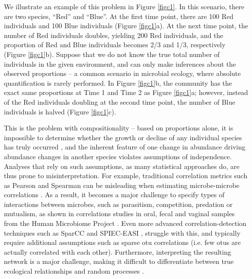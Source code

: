 We illustrate an example of this problem in Figure \ref{figc1}.  In this scenario, there are two species, “Red” and “Blue”. At the first time point, there are 100 Red individuals and 100 Blue individuals (Figure \ref{figc1}a). At the next time point, the number of Red individuals doubles, yielding 200 Red individuals, and the proportion of Red and Blue individuals becomes 2/3 and 1/3, respectively (Figure \ref{figc1}b). Suppose that we do not know the true total number of individuals in the given environment, and can only make inferences about the observed proportions -- a common scenario in microbial ecology, where absolute quantification is rarely performed.  In Figure \ref{figc1}b, the community has the exact same proportions at Time 1 and Time 2 as Figure \ref{figc1}a; however, instead of the Red individuals doubling at the second time point, the number of Blue individuals is halved (Figure \ref{figc1}c).\par
This is the problem with compositionality -- based on proportions alone, it is impossible to determine whether the growth or decline of any individual species has truly occurred \cite{Lovell_David_Muller_Warren_Taylor_Jennifer_Zwart_Alec_Helliwell2010-na}, and the inherent feature of one change in abundance driving abundance changes in another species violates assumptions of independence.  Analyses that rely on such assumptions, as many statistical approaches do, are thus prone to misinterpretation. For example, traditional correlation metrics such as Pearson and Spearman can be misleading when estimating microbe-microbe correlations \cite{sparcc, proportionality, spiec_easi, weiss_normalization}.  As a result, it becomes a major challenge to specify types of interactions between microbes, such as parasitism, competition, predation or mutualism, as shown in correlations studies in oral, fecal and vaginal samples from the Human Microbiome Project \cite{faust_microbial_interactions} \cite{sparcc}.  Even more advanced correlation-detection techniques such as SparCC \cite{sparcc} and SPIEC-EASI \cite{spiec_easi}, struggle with this, and typically require additional assumptions such as sparse \gls{otu} correlations (i.e. few \gls{otu}s are actually correlated with each other).  Furthermore, interpreting the resulting network is a major challenge, making it difficult to differentiate between true ecological relationships and random processes \cite{faust_microbial_interactions}.\par
